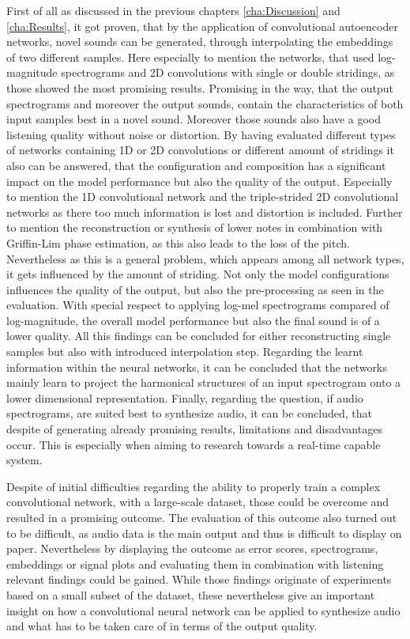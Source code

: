 First of all as discussed in the previous chapters \ref{cha:Discussion} and \ref{cha:Results}, it got proven, that by the application of convolutional autoencoder networks, novel sounds can be generated, through interpolating the embeddings of two different samples. Here especially to mention the networks, that used log-magnitude spectrograms and 2D convolutions with single or double stridings, as those showed the most promising results. Promising in the way, that the output spectrograms and moreover the output sounds, contain the characteristics of both input samples best in a novel sound. Moreover those sounds also have a good listening quality without noise or distortion. By having evaluated different types of networks containing 1D or 2D convolutions or different amount of stridings it also can be answered, that the configuration and composition has a significant impact on the model performance but also the quality of the output. Especially to mention the 1D convolutional network and the triple-strided 2D convolutional networks as there too much information is lost and distortion is included. Further to mention the reconstruction or synthesis of lower notes in combination with Griffin-Lim phase estimation, as this also leads to the loss of the pitch. Nevertheless as this is a general problem, which appears among all network types, it gets influenced by the amount of striding. Not only the model configurations influences the quality of the output, but also the pre-processing as seen in the evaluation. With special respect to applying log-mel spectrograms compared of log-magnitude, the overall model performance but also the final sound is of a lower quality. All this findings can be concluded for either reconstructing single samples but also with introduced interpolation step. Regarding the learnt information within the neural networks, it can be concluded that the networks mainly learn to project the harmonical structures of an input spectrogram onto a lower dimensional representation. Finally, regarding the question, if audio spectrograms, are suited best to synthesize audio, it can be concluded, that despite of generating already promising results, limitations and disadvantages occur. This is especially when aiming to research towards a real-time capable system. 

Despite of initial difficulties regarding the ability to properly train a complex convolutional network, with a large-scale dataset, those could be overcome and resulted in a promising outcome. The evaluation of this outcome also turned out to be difficult, as audio data is the main output and thus is difficult to display on paper. Nevertheless by displaying the outcome as error scores, spectrograms, embeddings or signal plots and evaluating them in combination with listening relevant findings could be gained. While those findings originate of experiments based on a small subset of the dataset, these nevertheless give an important insight on how a convolutional neural network can be applied to synthesize audio and what has to be taken care of in terms of the output quality.

